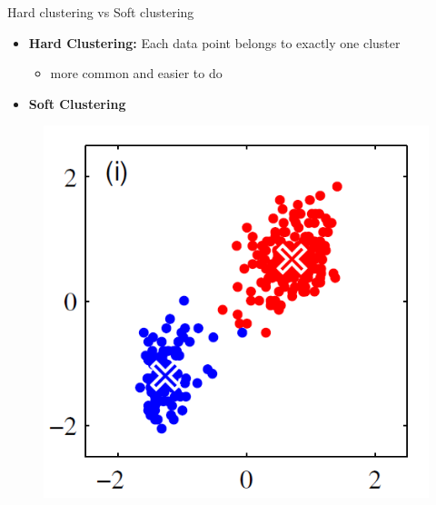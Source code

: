 \documentclass[serif, aspectratio=169]{beamer}
\begin{document}
\begin{frame}{Hard clustering vs Soft clustering}
    \begin{minipage}{0.55\textwidth}
        \begin{itemize}
        \item \textbf{Hard Clustering:} Each data point belongs to exactly one cluster
        \begin{itemize}
            \item more common and easier to do
        \end{itemize}
        \item \textbf{Soft Clustering}
    \end{itemize}
    \end{minipage}%
    \begin{minipage}{0.40\textwidth}
        \begin{figure}
            \centering
            \includegraphics[scale=0.5]{pic/hard_clustering.png}
        \end{figure}
    \end{minipage}
\end{frame}
\end{document}
